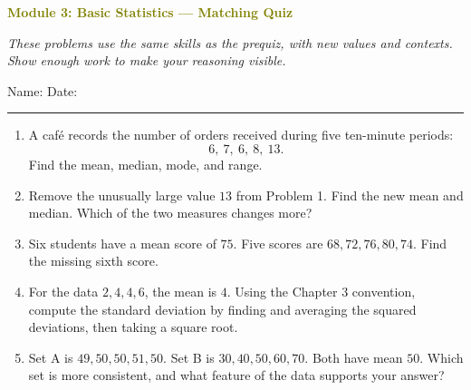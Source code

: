 \documentclass[11pt]{article}
\newcommand{\quizhead}[2]{%
  \clearpage
  {\Large\bfseries\textcolor{olive}{Module #1: #2 — Matching Quiz}}\par
  \textit{These problems use the same skills as the prequiz, with new values and contexts. Show enough work to make your reasoning visible.}\par
  Name: \hspace{2.6in} Date: \hspace{1.1in}\par
  \vspace{2pt}\textcolor{gold}{\rule{\linewidth}{1.2pt}}\par\smallskip
}
\newcommand{\workmed}{\par\vspace{0.62in}}
\newcommand{\worklarge}{\par\vspace{0.92in}}
\begin{document}
\quizhead{3}{Basic Statistics}
\begin{enumerate}
\item A café records the number of orders received during five ten-minute periods:
\[
6,\ 7,\ 6,\ 8,\ 13.
\]
Find the mean, median, mode, and range.
\worklarge

\item Remove the unusually large value \(13\) from Problem 1. Find the new mean and median. Which of the two measures changes more?
\worklarge

\item Six students have a mean score of \(75\). Five scores are \(68,72,76,80,74\). Find the missing sixth score.
\worklarge

\item For the data \(2,4,4,6\), the mean is \(4\). Using the Chapter 3 convention, compute the standard deviation by finding and averaging the squared deviations, then taking a square root.
\worklarge

\item Set A is \(49,50,50,51,50\). Set B is \(30,40,50,60,70\). Both have mean \(50\). Which set is more consistent, and what feature of the data supports your answer?
\workmed
\end{enumerate}
\end{document}
